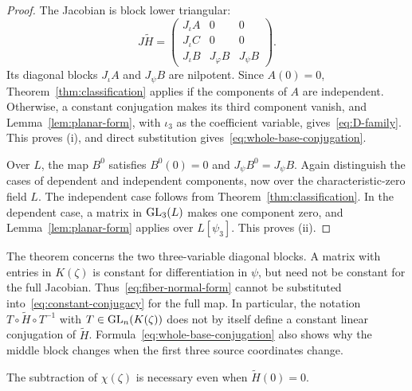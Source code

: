 \begin{proof}
The Jacobian is block lower triangular:
\begin{equation}\label{eq:block-jacobian}
 J\widetilde H=
 \begin{pmatrix}
 J_\iota A&0&0\\
 J_\iota C&0&0\\
 J_\iota B&J_\varphi B&J_\psi B
 \end{pmatrix}.
\end{equation}
Its diagonal blocks $J_\iota A$ and $J_\psi B$ are nilpotent. Since $A(0)=0$, Theorem~\ref{thm:classification} applies if the components of $A$ are independent. Otherwise, a constant conjugation makes its third component vanish, and Lemma~\ref{lem:planar-form}, with $\iota_3$ as the coefficient variable, gives~\eqref{eq:D-family}. This proves (i), and direct substitution gives~\eqref{eq:whole-base-conjugation}.

Over $L$, the map $B^0$ satisfies $B^0(0)=0$ and $J_\psi B^0=J_\psi B$. Again distinguish the cases of dependent and independent components, now over the characteristic-zero field $L$. The independent case follows from Theorem~\ref{thm:classification}. In the dependent case, a matrix in $\operatorname{GL}_3(L)$ makes one component zero, and Lemma~\ref{lem:planar-form} applies over $L[\psi_3]$. This proves (ii).
\end{proof}

\begin{remark}\label{rem:block-interpretation}
The theorem concerns the two three-variable diagonal blocks. A matrix with entries in $K(\zeta)$ is constant for differentiation in $\psi$, but need not be constant for the full Jacobian. Thus~\eqref{eq:fiber-normal-form} cannot be substituted into~\eqref{eq:constant-conjugacy} for the full map. In particular, the notation $T\circ\widetilde H\circ T^{-1}$ with $T\in\operatorname{GL}_n(K(\zeta))$ does not by itself define a constant linear conjugation of $\widetilde H$. Formula~\eqref{eq:whole-base-conjugation} also shows why the middle block changes when the first three source coordinates change.
\end{remark}

The subtraction of $\chi(\zeta)$ is necessary even when $\widetilde H(0)=0$.

